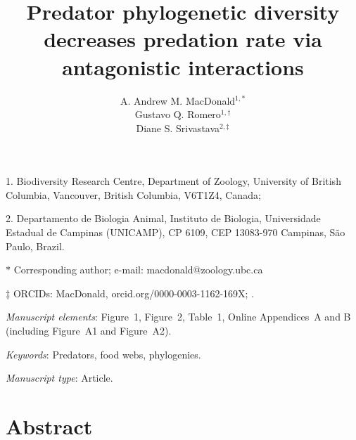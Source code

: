 \documentclass[11pt]{article}
\title{Predator phylogenetic diversity decreases predation rate via antagonistic interactions}
\author{A. Andrew M. MacDonald$^{1,\ast}$ \\ 
Gustavo Q. Romero$^{1,\dag}$ \\ 
Diane S. Srivastava$^{2,\ddag}$}
\date{}
\begin{document}
\maketitle

\noindent{}1. Biodiversity Research Centre, Department of Zoology, University of British Columbia, Vancouver, British Columbia, V6T1Z4, Canada;

\noindent{}2. Departamento de Biologia Animal, Instituto de Biologia, Universidade Estadual de Campinas (UNICAMP), CP 6109, CEP 13083-970 Campinas, S\~{a}o Paulo, Brazil.

\noindent{}$\ast$ Corresponding author; e-mail: macdonald@zoology.ubc.ca

\noindent{}$\ddag$ ORCIDs: MacDonald, orcid.org/0000-0003-1162-169X; .

\bigskip

\textit{Manuscript elements}: Figure~1, Figure~2, Table~1, Online
Appendices~A and B (including Figure~A1 and Figure~A2). %

\bigskip

\textit{Keywords}: Predators, food webs, phylogenies.

\bigskip

\textit{Manuscript type}: Article. 

\bigskip


\linenumbers{}
\modulolinenumbers[3]

\newpage{}

\section*{Abstract}
\end{document}
